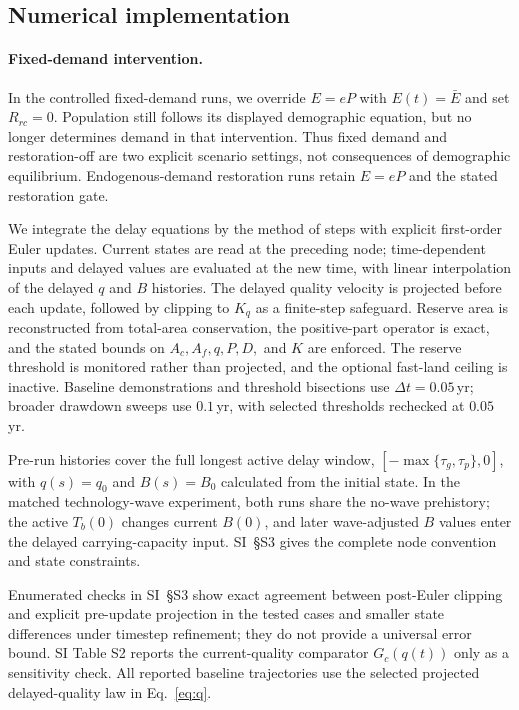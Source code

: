 \documentclass[preprint,12pt,authoryear]{elsarticle}
\begin{document}
\subsection{Numerical implementation}\label{sec:numerics}

\paragraph{Fixed-demand intervention.} In the controlled fixed-demand runs, we override $E=eP$ with $E(t)=\bar E$ and set $R_{rc}=0$. Population still follows its displayed demographic equation, but no longer determines demand in that intervention. Thus fixed demand and restoration-off are two explicit scenario settings, not consequences of demographic equilibrium. Endogenous-demand restoration runs retain $E=eP$ and the stated restoration gate.

We integrate the delay equations by the method of steps with explicit first-order Euler updates. Current states are read at the preceding node; time-dependent inputs and delayed values are evaluated at the new time, with linear interpolation of the delayed $q$ and $B$ histories. The delayed quality velocity is projected before each update, followed by clipping to $K_q$ as a finite-step safeguard. Reserve area is reconstructed from total-area conservation, the positive-part operator is exact, and the stated bounds on $A_c,A_f,q,P,D,$ and $K$ are enforced. The reserve threshold is monitored rather than projected, and the optional fast-land ceiling is inactive. Baseline demonstrations and threshold bisections use $\Delta t=0.05$\,yr; broader drawdown sweeps use $0.1$\,yr, with selected thresholds rechecked at $0.05$\,yr.

Pre-run histories cover the full longest active delay window, $[-\max\{\tau_g,\tau_p\},0]$, with $q(s)=q_0$ and $B(s)=B_0$ calculated from the initial state. In the matched technology-wave experiment, both runs share the no-wave prehistory; the active $T_b(0)$ changes current $B(0)$, and later wave-adjusted $B$ values enter the delayed carrying-capacity input. SI~\S S3 gives the complete node convention and state constraints.

Enumerated checks in SI~\S S3 show exact agreement between post-Euler clipping and explicit pre-update projection in the tested cases and smaller state differences under timestep refinement; they do not provide a universal error bound. SI Table S2 reports the current-quality comparator $G_c(q(t))$ only as a sensitivity check. All reported baseline trajectories use the selected projected delayed-quality law in Eq.~\eqref{eq:q}.
\end{document}
